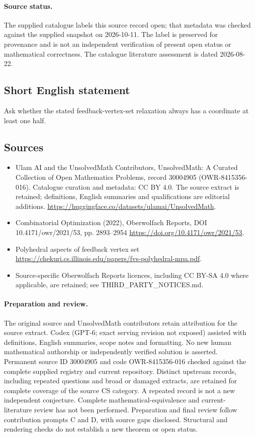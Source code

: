 \documentclass[11pt]{article}
\begin{document}
\paragraph{Source status.}
The supplied catalogue labels this source record open; that metadata was checked against the supplied snapshot on 2026-10-11. The label is preserved for provenance and is not an independent verification of present open status or mathematical correctness. The catalogue literature assessment is dated 2026-08-22.
\subsection{Short English statement}
Ask whether the stated feedback-vertex-set relaxation always has a coordinate at least one half.
\subsection{Sources}
\begin{itemize}
\item[\hypertarget{source:30004905:1}{S1}] Ulam AI and the UnsolvedMath Contributors, UnsolvedMath: A Curated Collection of Open Mathematics Problems, record 30004905 (OWR-8415356-016). Catalogue curation and metadata: CC BY 4.0. The source extract is retained; definitions, English summaries and qualifications are editorial additions.
\url{https://huggingface.co/datasets/ulamai/UnsolvedMath}.
\item[\hypertarget{source:30004905:2}{S2}] Combinatorial Optimization (2022), Oberwolfach Reports, DOI 10.4171/owr/2021/53, pp. 2893--2954
\url{https://doi.org/10.4171/owr/2021/53}.
\item[\hypertarget{source:30004905:3}{S3}] Polyhedral aspects of feedback vertex set
\url{https://chekuri.cs.illinois.edu/papers/fvs-polyhedral-mpa.pdf}.
\item Source-specific Oberwolfach Reports licences, including CC BY-SA 4.0 where applicable, are retained; see THIRD\_PARTY\_NOTICES.md.
\end{itemize}
\paragraph{Preparation and review.}
The original source and UnsolvedMath contributors retain attribution for the source extract. Codex (GPT-6; exact serving revision not exposed) assisted with definitions, English summaries, scope notes and formatting. No new human mathematical authorship or independently verified solution is asserted. Permanent source ID 30004905 and code OWR-8415356-016 checked against the complete supplied registry and current repository. Distinct upstream records, including repeated questions and broad or damaged extracts, are retained for complete coverage of the source CS category. A repeated record is not a new independent conjecture. Complete mathematical-equivalence and current-literature review has not been performed. Preparation and final review follow contribution prompts C and D, with source gaps disclosed. Structural and rendering checks do not establish a new theorem or open status.
\label{end:30004905}
\end{document}
